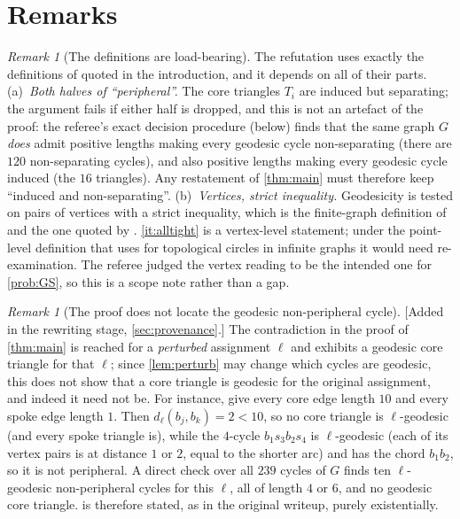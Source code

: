 \documentclass[11pt,a4paper]{article}
\theoremstyle{plain}
\theoremstyle{definition}
\theoremstyle{remark}
\newtheorem{remark}[theorem]{Remark}
\newcommand{\dl}{d_\ell}
\begin{document}
\section{Remarks}

\begin{remark}[The definitions are load-bearing]\label{rem:defs}
The refutation uses exactly the definitions of \cite{GS09} quoted in the introduction, and it depends on all of their parts. (a)~\emph{Both halves of ``peripheral''.} The core triangles $T_i$ are induced but separating; the argument fails if either half is dropped, and this is not an artefact of the proof: the referee's exact decision procedure (below) finds that the same graph $G$ \emph{does} admit positive lengths making every geodesic cycle non-separating (there are $120$ non-separating cycles), and also positive lengths making every geodesic cycle induced (the $16$ triangles). Any restatement of \cref{thm:main} must therefore keep ``induced and non-separating''. (b)~\emph{Vertices, strict inequality.} Geodesicity is tested on pairs of vertices with a strict inequality, which is the finite-graph definition of \cite[\S3.1]{GS09} and the one quoted by \cite{OPG}. \ref{it:alltight} is a vertex-level statement; under the point-level definition that \cite[\S2]{GS09} uses for topological circles in infinite graphs it would need re-examination. The referee judged the vertex reading to be the intended one for \cref{prob:GS}, so this is a scope note rather than a gap.
\end{remark}

\begin{remark}[The proof does not locate the geodesic non-peripheral cycle]\label{rem:locate}
[Added in the rewriting stage, \cref{sec:provenance}.] The contradiction in the proof of \cref{thm:main} is reached for a \emph{perturbed} assignment $\ell$ and exhibits a geodesic core triangle for that $\ell$; since \cref{lem:perturb} may change which cycles are geodesic, this does not show that a core triangle is geodesic for the original assignment, and indeed it need not be. For instance, give every core edge length $10$ and every spoke edge length $1$. Then $\dl(b_j,b_k)=2<10$, so no core triangle is $\ell$-geodesic (and every spoke triangle is), while the $4$-cycle $b_1s_3b_2s_4$ is $\ell$-geodesic (each of its vertex pairs is at distance $1$ or $2$, equal to the shorter arc) and has the chord $b_1b_2$, so it is not peripheral. A direct check over all $239$ cycles of $G$ finds ten $\ell$-geodesic non-peripheral cycles for this $\ell$, all of length $4$ or $6$, and no geodesic core triangle.  is therefore stated, as in the original writeup, purely existentially.
\end{remark}
\end{document}
